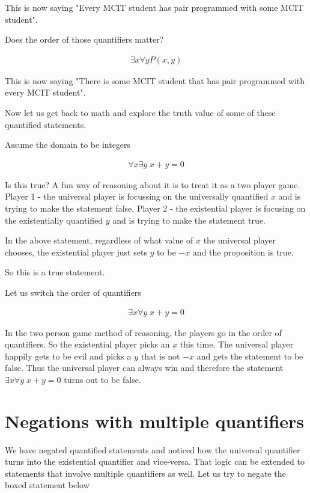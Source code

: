 \documentclass[12pt]{article}
\begin{document}
This is now saying "Every MCIT student has pair programmed with some MCIT student".

Does the order of those quantifiers matter?

\begin{align*}
\exists x \forall y P(x,y)
\end{align*}

This is now saying "There is some MCIT student that has pair programmed with every MCIT student".

Now let us get back to math and explore the truth value of some of these quantified statements.

Assume the domain to be integers

\begin{align*}
\forall x \exists y \; x + y = 0
\end{align*}

Is this true? A fun way of reasoning about it is to treat it as a two player game. Player 1 - the universal player is focussing on the universally quantified $x$ and is trying to make the statement false. Player 2 - the existential player is focusing on the existentially quantified $y$ and is trying to make the statement true.

In the above statement, regardless of what value of $x$ the universal player chooses, the existential player just sets $y$ to be $-x$ and the proposition is true. 

So this is a true statement.

Let us switch the order of quantifiers

\begin{align*}
\exists x \forall y \; x + y = 0
\end{align*}

In the two person game method of reasoning, the players go in the order of quantifiers. So the existential player picks an $x$ this time. The universal player happily gets to be evil and picks a $y$ that is not $-x$ and gets the statement to be false. Thus the universal player can always win and therefore the statement $\exists x \forall y \; x + y = 0$ turns out to be false.

\section*{Negations with multiple quantifiers}

We have negated quantified statements and noticed how the universal quantifier turns into the existential quantifier and vice-versa. That logic can be extended to statements that involve multiple quantifiers as well. Let us try to negate the boxed statement below
\end{document}
